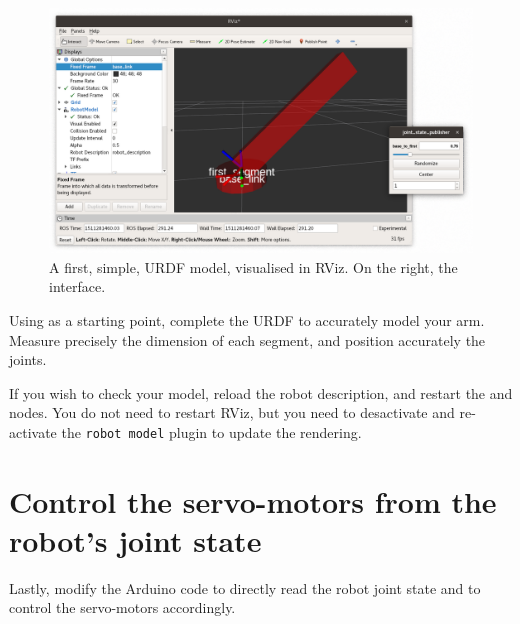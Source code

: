 \documentclass{instructions}
\begin{document}
\begin{figure}[h!]
    \centering
    \includegraphics[width=0.9\linewidth]{urdf-rviz}
    \caption{A first, simple, URDF model, visualised in RViz. On the right, the
     interface.}
    \label{rviz-urdf}
\end{figure}



Using  as a starting point, complete the URDF to accurately
model your arm. Measure precisely the dimension of each segment, and position
accurately the joints.



If you wish to check your model, reload the robot description, and restart the
 and  nodes. You do not need
to restart RViz, but you need to desactivate and re-activate the \texttt{robot
model} plugin to update the rendering.



\part{Control the servo-motors from the robot's joint state}

Lastly, modify the Arduino code to directly read the robot joint state and to
control the servo-motors accordingly.
\end{document}
